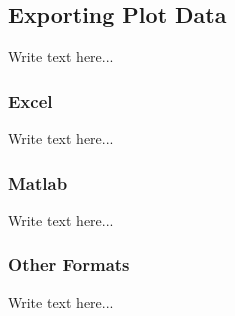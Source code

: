 
\subsection{Exporting Plot Data}
Write text here...

\subsubsection{Excel}
Write text here...

\subsubsection{Matlab}
Write text here...

\subsubsection{Other Formats}
Write text here...

